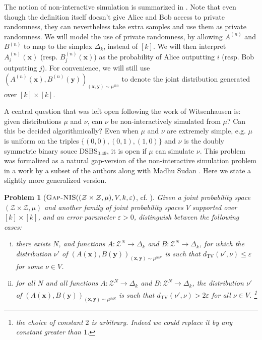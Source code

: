 \documentclass[11pt]{article}
\newcommand{\dTV}{d_{\mathrm{TV}}}
\newcommand{\eps}{\varepsilon}
\newcommand{\bx}{{\bm x}}
\newcommand{\by}{{\bm y}}
\newcommand{\calZ}{\mathcal{Z}}
\newtheorem{problem}[theorem]{Problem}
\newcommand{\ANIS}{\text{\sc Gap-NIS}}
\begin{document}
The notion of non-interactive simulation is summarized in . Note that even though the definition itself doesn't give Alice and Bob access to private randomness, they can nevertheless take extra samples and use them as private randomness. We will model the use of private randomness, by allowing $A^{(n)}$ and $B^{(n)}$ to map to the simplex $\Delta_k$, instead of $[k]$. We will then interpret $A^{(n)}_i(\bx)$ (resp. $B^{(n)}_j(\bx)$) as the probability of Alice outputting $i$ (resp. Bob outputting $j$). For convenience, we will still use $(A^{(n)}(\bx), B^{(n)}(\by))_{(\bx, \by) \sim \mu^{\otimes n}}$ to denote the joint distribution generated over $[k] \times [k]$.

A central question that was left open following the work of Witsenhausen is: given distributions $\mu$ and $\nu$, can $\nu$ be non-interactively simulated from $\mu$? Can this be decided algorithmically? %
Even when $\mu$ and $\nu$ are extremely simple, e.g. $\mu$ is uniform on the triples $\{(0,0), (0,1), (1,0)\}$ and $\nu$ is the doubly symmetric binary souce $\mathrm{DSBS}_{0.49}$, it is open if $\mu$ can simulate $\nu$. This problem was formalized as a natural gap-version of the non-interactive simulation problem in a work by a subset of the authors along with Madhu Sudan \cite{GKS_NIS_decidable}. Here we state a slightly more generalized version.

\begin{problem}[$\ANIS((\calZ \times \calZ, \mu), V, k, \eps)$, cf. \cite{GKS_NIS_decidable}] \label{prob:approx_decide_full}
	Given a joint probability space $(\calZ \times \calZ, \mu)$ and another family of joint probability spaces $V$ supported over $[k] \times [k]$, and an error parameter $\eps > 0$, distinguish between the following cases:
	\begin{enumerate}[(i)]
		\item there exists $N$, and functions $A : \calZ^N \to \Delta_k$ and $B : \calZ^N \to \Delta_k$, for which the distribution $\nu' $ of $(A(\bx), B(\by))_{(\bx, \by) \sim \mu^{\otimes N}}$ is such that $\dTV(\nu', \nu) \le \eps$ for some $\nu \in V$.
		\item for all $N$ and all functions $A : \calZ^N \to \Delta_k$ and $B : \calZ^N \to \Delta_k$, the distribution $\nu'$ of $(A(\bx), B(\by))_{(\bx, \by) \sim \mu^{\otimes N}}$ is such that $\dTV(\nu', \nu) > 2 \eps$ for all $\nu \in V$. \footnote{the choice of constant $2$ is arbitrary. Indeed we could replace it by any constant greater than $1$.}
	\end{enumerate}
\end{problem}
\end{document}
